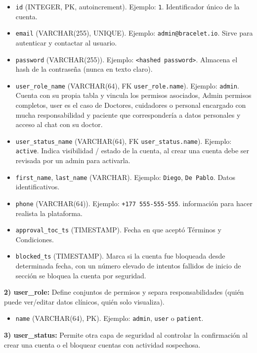 \documentclass[12pt, a4paper]{article}
\begin{document}
\begin{itemize}
	\item \texttt{id} (INTEGER, PK, autoincrement). Ejemplo: \texttt{1}. Identificador único de la cuenta.
	\item \texttt{email} (VARCHAR(255), UNIQUE). Ejemplo: \texttt{admin@bracelet.io}. Sirve para autenticar y contactar al usuario.
	\item \texttt{password} (VARCHAR(255)). Ejemplo: \texttt{\textless hashed password\textgreater}. Almacena el hash de la contraseña (nunca en texto claro).
	\item \texttt{user\_role\_name} (VARCHAR(64), FK \texttt{user\_role.name}). Ejemplo: \texttt{admin}. Cuenta con su propia tabla y vincula los permisos asociados, Admin permisos completos, user es el caso de Doctores, cuidadores o personal encargado con mucha responsabilidad y paciente que correspondería a datos personales y acceso al chat con su doctor.
	\item \texttt{user\_status\_name} (VARCHAR(64), FK \texttt{user\_status.name}). Ejemplo: \texttt{active}. Indica visibilidad / estado de la cuenta, al crear una cuenta debe ser revisada por un admin para activarla.
	\item \texttt{first\_name}, \texttt{last\_name} (VARCHAR). Ejemplo: \texttt{Diego}, \texttt{De Pablo}. Datos identificativos.
	\item \texttt{phone} (VARCHAR(64)). Ejemplo: \texttt{+177 555-555-555}. información para hacer realista la plataforma.
	\item \texttt{approval\_toc\_ts} (TIMESTAMP). Fecha en que aceptó Términos y Condiciones.
	\item \texttt{blocked\_ts} (TIMESTAMP). Marca si la cuenta fue bloqueada desde determinada fecha, con un número elevado de intentos fallidos de inicio de sección se bloquea la cuenta por seguridad.
\end{itemize}


\textbf{2) user\_role:} Define conjuntos de permisos y separa responsabilidades (quién puede ver/editar datos clínicos, quién solo visualiza).

\begin{itemize}
	\item \texttt{name} (VARCHAR(64), PK). Ejemplo: \texttt{admin}, \texttt{user} o \texttt{patient}.
\end{itemize}


\textbf{3) user\_status:} Permite otra capa de seguridad al controlar la confirmación al crear una cuenta o el bloquear cuentas con actividad sospechosa.
\end{document}
